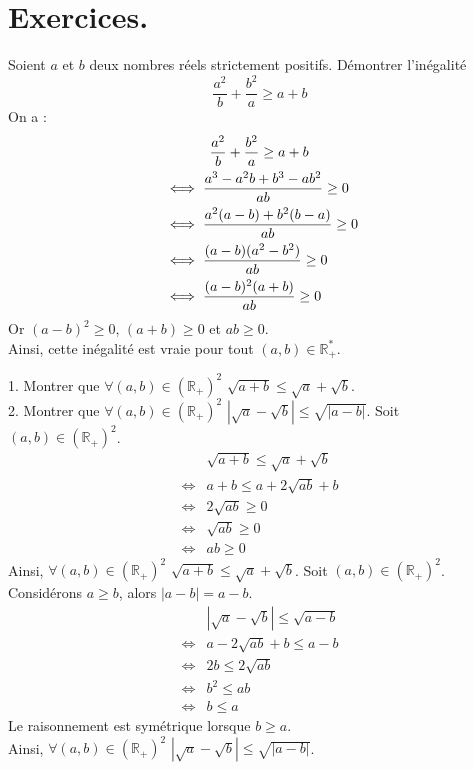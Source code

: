 \documentclass[11pt]{article}
\begin{document}
\section{Exercices.}

\begin{exercice}{}{}
    Soient $a$ et $b$ deux nombres réels strictement positifs. Démontrer l'inégalité
    \begin{equation*}
        \frac{a^2}{b}+\frac{b^2}{a} \geq a + b
    \end{equation*}
    \tcblower
    On a :
    \begin{align*}
        &\hspace{1.2cm}\frac{a^2}{b}+\frac{b^2}{a} \geq a+b\\
        &\iff\frac{a^3-a^2b+b^3-ab^2}{ab}\geq0\\
        &\iff\frac{a^2(a-b)+b^2(b-a)}{ab}\geq0\\
        &\iff\frac{(a-b)(a^2-b^2)}{ab}\geq0\\
        &\iff\frac{(a-b)^2(a+b)}{ab}\geq0
    \end{align*}
    Or $(a-b)^2\geq0$, $(a+b)\geq0$ et $ab\geq0$.\\
    Ainsi, cette inégalité est vraie pour tout $(a,b)\in\mathbb{R}^*_+$.
\end{exercice}

\begin{exercice}{}{}
    1. Montrer que $\forall(a,b)\in(\mathbb{R}_+)^2$ $\sqrt{a+b}\leq\sqrt{a}+\sqrt{b}$.\\
    2. Montrer que $\forall(a,b)\in(\mathbb{R}_+)^2$ $|\sqrt{a}-\sqrt{b}|\leq\sqrt{|a-b|}$.
    \tcblower
     Soit $(a,b)\in(\mathbb{R}_+)^2$.
    \begin{align*}
        &\sqrt{a+b}\leq\sqrt{a}+\sqrt{b}\\
        \iff&a+b\leq a + 2\sqrt{ab} + b\\
        \iff&2\sqrt{ab} \geq 0\\
        \iff&\sqrt{ab} \geq 0\\
        \iff&ab \geq 0
    \end{align*}
    Ainsi, $\forall(a,b)\in(\mathbb{R}_+)^2$ $\sqrt{a+b}\leq\sqrt{a}+\sqrt{b}$.\n
     Soit $(a,b)\in(\mathbb{R}_+)^2$.\\
    Considérons $a\geq b$, alors $|a-b| = a-b$.
    \begin{align*}
        &|\sqrt{a}-\sqrt{b}|\leq\sqrt{a-b}\\
        \iff& a - 2\sqrt{ab} + b \leq a-b\\
        \iff& 2b \leq 2\sqrt{ab}\\
        \iff& b^2 \leq ab\\
        \iff&b \leq a
    \end{align*}
    Le raisonnement est symétrique lorsque $b\geq a$.\\
    Ainsi, $\forall(a,b)\in(\mathbb{R}_+)^2$ $|\sqrt{a}-\sqrt{b}|\leq\sqrt{|a-b|}$.
\end{exercice}
\end{document}
